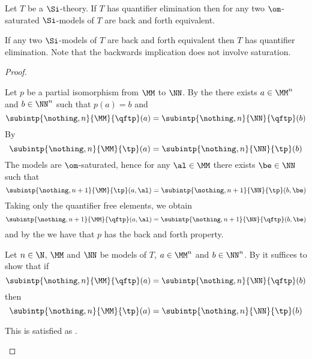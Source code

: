 \begin{prop}
    Let $T$ be a $\Si$-theory.
    If $T$ has quantifier elimination then
    for any two $\om$-saturated $\Si$-models of $T$
    are back and forth equivalent.

    If any two $\Si$-models of $T$
    are back and forth equivalent then $T$ has quantifier 
    elimination.
    Note that the backwards implication does not involve saturation.%
\end{prop}
\begin{proof}
    \begin{forward}
        Let $p$ be a partial isomorphism from $\MM$ to $\NN$.
        By the 
        there exists $a \in \MM^n$ and $b \in \NN^n$ such that 
        $p(a) = b$ and 
        \[\subintp{\nothing,n}{\MM}{\qftp}(a) = 
        \subintp{\nothing,n}{\NN}{\qftp}(b)\]
        By 
        \[\subintp{\nothing,n}{\MM}{\tp}(a) = 
        \subintp{\nothing,n}{\NN}{\tp}(b)\]
        The models are $\om$-saturated, hence  
        for any $\al \in \MM$ there exists $\be \in \NN$ such that 
        \[\subintp{\nothing,n+1}{\MM}{\tp}(a,\al) = 
        \subintp{\nothing,n+1}{\NN}{\tp}(b,\be)\]
        Taking only the quantifier free elements,
        we obtain 
        \[\subintp{\nothing,n+1}{\MM}{\qftp}(a,\al) = 
        \subintp{\nothing,n+1}{\NN}{\qftp}(b,\be)\]
        and by the
        we have that $p$ has the back and forth property.
    \end{forward}

    \begin{backward}
        Let $n \in \N$, $\MM$ and $\NN$ be models of $T$,
        $a \in \MM^n$ and $b \in \NN^n$.
        By  it suffices to show that 
        if \[\subintp{\nothing,n}{\MM}{\qftp}(a) = 
        \subintp{\nothing,n}{\NN}{\qftp}(b)\]
        then \[\subintp{\nothing,n}{\MM}{\tp}(a) = 
        \subintp{\nothing,n}{\NN}{\tp}(b)\]

        This is satisfied as
        .
    \end{backward}
\end{proof}


